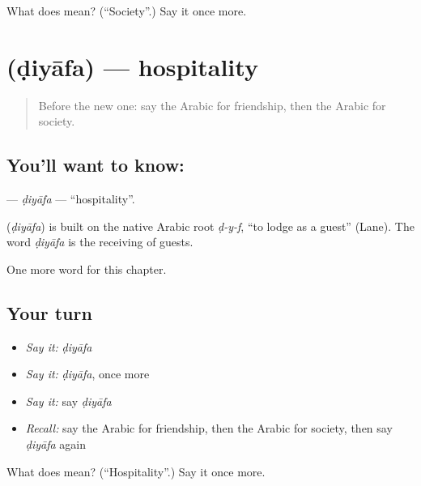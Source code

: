 \begin{tcolorbox}[breakable,colback=teal!4,colframe=teal!35!black,title={Before you move on}]
What does  mean? (\textquotedblleft{}Society\textquotedblright{}.) Say it once more.
\end{tcolorbox}
\section[\texorpdfstring{\ar{ضيافة} (ḍiyāfa)}{ضيافة (ḍiyāfa)}]{ (ḍiyāfa) — hospitality}

\label{lesson:AR-C175-diyafa}



\begin{quote}
Before the new one: say the Arabic for friendship, then the Arabic for society.
\end{quote}

\subsection*{You'll want to know: }
\textbf{} — \emph{ḍiyāfa} — \textquotedblleft{}hospitality\textquotedblright{}.

\begin{cousinweb}
\textbf{} (\emph{ḍiyāfa}) is built on the native Arabic root \emph{ḍ-y-f}, \textquotedblleft{}to lodge as a guest\textquotedblright{} (Lane). The word \emph{ḍiyāfa} is the receiving of guests.
\end{cousinweb}

\begin{grammarlens}[title={What you've built}]
One more word for this chapter.
\end{grammarlens}

\subsection*{Your turn}
\begin{itemize}
\raggedright
  \item \emph{Say it:} \emph{ḍiyāfa}
  \item \emph{Say it:} \emph{ḍiyāfa}, once more
  \item \emph{Say it:} say \emph{ḍiyāfa}
  \item \emph{Recall:} say the Arabic for friendship, then the Arabic for society, then say \emph{ḍiyāfa} again
\end{itemize}

\begin{tcolorbox}[breakable,colback=teal!4,colframe=teal!35!black,title={Before you move on}]
What does  mean? (\textquotedblleft{}Hospitality\textquotedblright{}.) Say it once more.
\end{tcolorbox}
